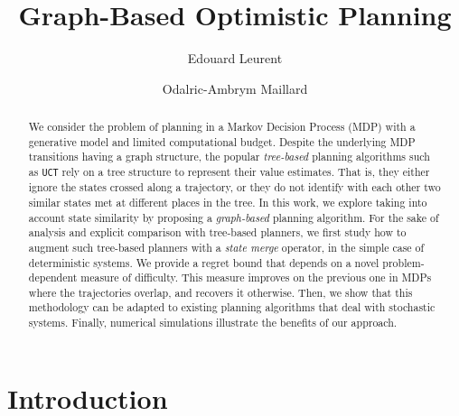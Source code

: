 \documentclass[runningheads]{llncs}
\begin{document}
\title{Graph-Based Optimistic Planning}
%
%
\author{Edouard Leurent\and Odalric-Ambrym Maillard}
%
%
%
\maketitle              %
%
\begin{abstract}
	We consider the problem of planning in a Markov Decision Process (MDP) with a generative model and limited computational budget. Despite the underlying MDP transitions having a graph structure, the popular \emph{tree-based} planning algorithms such as \texttt{UCT} rely on a tree structure to represent their value estimates. That is, they either ignore the states crossed along a trajectory, or they do not identify with each other two similar states met at different places in the tree. In this work, we explore taking into account state similarity by proposing a \emph{graph-based} planning algorithm. For the sake of analysis and explicit comparison with tree-based planners, we first study how to augment such tree-based planners with a \emph{state merge} operator, in the simple case of deterministic systems. We provide a regret bound that depends on a novel problem-dependent measure of difficulty. This measure improves on the previous one in MDPs where the trajectories overlap, and recovers it otherwise. Then, we show that this methodology can be adapted to existing planning algorithms that deal with stochastic systems. Finally, numerical simulations illustrate the benefits of our approach.
	
\end{abstract}
%
%
%

\section{Introduction}
\end{document}
